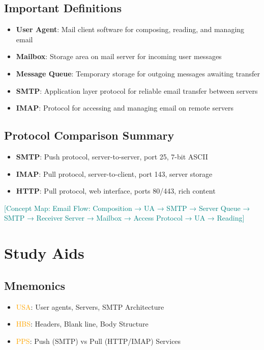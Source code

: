 \documentclass[12pt]{article}
\begin{document}
\subsection{Important Definitions}
\begin{itemize}
    \item \textbf{User Agent}: Mail client software for composing, reading, and managing email
    \item \textbf{Mailbox}: Storage area on mail server for incoming user messages
    \item \textbf{Message Queue}: Temporary storage for outgoing messages awaiting transfer
    \item \textbf{SMTP}: Application layer protocol for reliable email transfer between servers
    \item \textbf{IMAP}: Protocol for accessing and managing email on remote servers
\end{itemize}

\subsection{Protocol Comparison Summary}
\begin{itemize}
    \item \textbf{SMTP}: Push protocol, server-to-server, port 25, 7-bit ASCII
    \item \textbf{IMAP}: Pull protocol, server-to-client, port 143, server storage
    \item \textbf{HTTP}: Pull protocol, web interface, ports 80/443, rich content
\end{itemize}

\textcolor{teal}{[Concept Map: Email Flow: Composition → UA → SMTP → Server Queue → SMTP → Receiver Server → Mailbox → Access Protocol → UA → Reading]}

\section{Study Aids}

\subsection{Mnemonics}
\begin{itemize}
    \item \textcolor{orange}{USA}: User agents, Servers, SMTP Architecture
    \item \textcolor{orange}{HBS}: Headers, Blank line, Body Structure
    \item \textcolor{orange}{PPS}: Push (SMTP) vs Pull (HTTP/IMAP) Services
\end{itemize}
\end{document}
